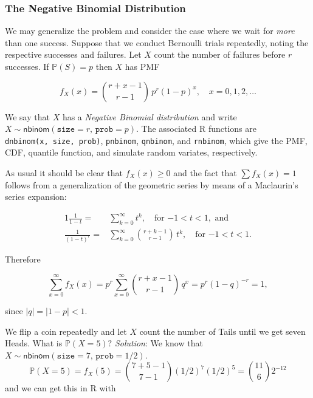 \documentclass[]{book}
\numberwithin{equation}{chapter}
\numberwithin{figure}{chapter}
\theoremstyle{plain}
\theoremstyle{definition}
\theoremstyle{remark}
\theoremstyle{definition}
\theoremstyle{definition}
\theoremstyle{remark}
\let\BeginKnitrBlock\begin \let\EndKnitrBlock\end
\begin{document}
\subsubsection{The Negative Binomial
Distribution}\label{sub-the-negative-binomial}

We may generalize the problem and consider the case where we wait for
\emph{more} than one success. Suppose that we conduct Bernoulli trials
repeatedly, noting the respective successes and failures. Let \(X\)
count the number of failures before \(r\) successes. If
\(\mathbb{P}(S)=p\) then \(X\) has PMF

\begin{equation}
f_{X}(x)={r+x-1 \choose r-1}\, p^{r}(1-p)^{x},\quad x=0,1,2,\ldots
\end{equation}

We say that \(X\) has a \emph{Negative Binomial distribution} and write
\(X\sim\mathsf{nbinom}(\mathtt{size}=r,\,\mathtt{prob}=p)\). The
associated R functions are \texttt{dnbinom(x,\ size,\ prob)},
\texttt{pnbinom}, \texttt{qnbinom}, and \texttt{rnbinom}, which give the
PMF, CDF, quantile function, and simulate random variates, respectively.

As usual it should be clear that \(f_{X}(x)\geq 0\) and the fact that
\(\sum f_{X}(x)=1\) follows from a generalization of the geometric
series by means of a Maclaurin's series expansion:

\begin{alignat}{1}
\frac{1}{1-t}= & \sum_{k=0}^{\infty}t^{k},\quad \mbox{for \(-1 < t < 1\)},\mbox{ and}\\
\frac{1}{(1-t)^{r}}= & \sum_{k=0}^{\infty}{r+k-1 \choose r-1}\, t^{k},\quad \mbox{for \(-1 < t < 1\)}.
\end{alignat}

Therefore

\begin{equation}
\sum_{x=0}^{\infty}f_{X}(x)=p^{r}\sum_{x=0}^{\infty}{r+x-1 \choose r-1}\, q^{x}=p^{r}(1-q)^{-r}=1,
\end{equation}

since \(|q|=|1-p|<1\).

\bigskip

\BeginKnitrBlock{example}
\protect\hypertarget{ex:unnamed-chunk-238}{}{\label{ex:unnamed-chunk-238}}We
flip a coin repeatedly and let \(X\) count the number of Tails until we
get seven Heads. What is \(\mathbb{P}(X=5)?\) \emph{Solution}: We know
that \(X\sim\mathsf{nbinom}(\mathtt{size}=7,\,\mathtt{prob}=1/2)\).\\
\[
\mathbb{P}(X=5)=f_{X}(5)={7+5-1 \choose 7-1}(1/2)^{7}(1/2)^{5}={11
\choose 6}2^{-12} 
\] and we can get this in R with
\EndKnitrBlock{example}
\end{document}
